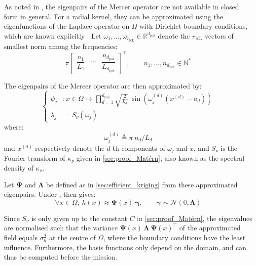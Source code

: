 As noted in , the eigenpairs of the Mercer operator are not available in closed form in general. For a radial kernel, they can be approximated using the eigenfunctions of the Laplace operator on $\Omega$ with Dirichlet boundary conditions, which are known explicitly \cite{bib:reduced-rank}. Let $\omega_1,\dots,\omega_{r_{\mathrm{KL}}}\in\mathbb{R}^{d_{\mathrm{pos}}}$ denote the $r_{\mathrm{KL}}$ vectors of smallest norm among the frequencies:
\begin{equation}
	\pi\begin{bmatrix}
	\dfrac{n_1}{L_1}&\cdots&\dfrac{n_{d_{\mathrm{pos}}}}{L_{d_{\mathrm{pos}}}}
	\end{bmatrix}^\top,\qquad n_1,\dots,n_{d_{\mathrm{pos}}}\in\mathbb{N}^*
\end{equation}

The eigenpairs of the Mercer operator are then approximated by:
\begin{equation}
	\left\{\begin{aligned}
	\psi_j&:x\in\Omega\mapsto\prod_{d=1}^{d_{\mathrm{pos}}}\sqrt{\frac{2}{L_d}}\:\sin\left(\omega_j^{(d)}\left(x^{(d)}-a_d\right)\right)\\
	\lambda_j&=S_\nu(\omega_j)
	\end{aligned}\right.\label{eq:Laplace_basis}
\end{equation}
where:
\begin{equation}
	\omega_j^{(d)}\triangleq\pi\:n_d/L_d
\end{equation}
and $x^{(d)}$ respectively denote the $d$-th components of $\omega_j$ and $x$, and $S_\nu$ is the Fourier transform of $\kappa_\nu$ given in \cref{sec:proof_Matérn}, also known as the spectral density of $\kappa_\nu$.

Let $\boldsymbol{\Psi}$ and $\boldsymbol{\Lambda}$ be defined as in \cref{sec:efficient_kriging} from these approximated eigenpairs. Under ,  then gives:
\begin{equation}
	\forall x\in\Omega,\:h(x)\approx\boldsymbol{\Psi}(x)\:\boldsymbol{\gamma},\qquad\boldsymbol{\gamma}\sim\mathcal{N}(0,\boldsymbol{\Lambda})\label{eq:SLAM_map}
\end{equation}

Since $S_\nu$ is only given up to the constant $C$ in \cref{sec:proof_Matérn}, the eigenvalues are normalised such that the variance $\boldsymbol{\Psi}(x)\:\boldsymbol{\Lambda}\:\boldsymbol{\Psi}(x)^\top$ of the approximated field equals $\sigma_h^2$ at the centre of $\Omega$, where the boundary conditions have the least influence. Furthermore, the basis functions only depend on the domain, and can thus be computed before the mission.


